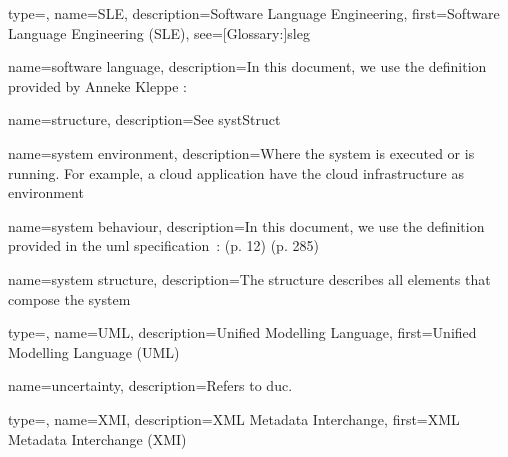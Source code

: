 {
	type=\acronymtype,
	name={SLE},
	description={Software Language Engineering},
	first={Software Language Engineering (SLE)},
	see=[Glossary:]{sleg}
}

{
	name={software language},
	description={In this document, we use the definition provided by Anneke Kleppe \cite{kleppe2008software}: }
}

{
	name={structure},
	description={See \gls{systStruct}}
}

{
	name={system environment},
	description={Where the system is executed or is running. For example, a cloud application have the cloud infrastructure as environment}
}

{
	name={system behaviour},
	description={In this document, we use the definition provided in the \gls{uml} specification~\cite{omg2017umlspec}: (p. 12) (p. 285)}
}

{
	name={system structure},
	description={The structure describes all elements that compose the system}
}

{
	type=\acronymtype,
	name={UML},
	description={Unified Modelling Language},
	first={Unified Modelling Language (UML)}
}

{
	name={uncertainty},
	description={Refers to \gls{duc}.}
}

{
	type=\acronymtype,
	name={XMI},
	description={XML Metadata Interchange},
	first={XML Metadata Interchange (XMI)}
}

